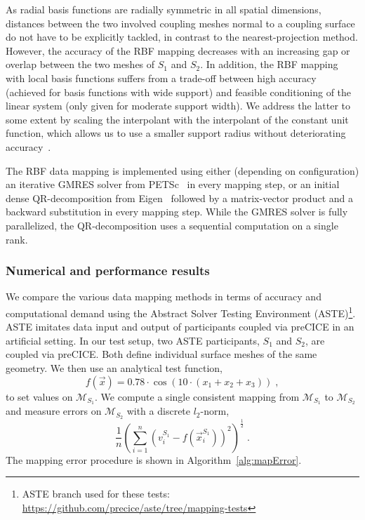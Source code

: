 As radial basis functions are radially symmetric in all spatial dimensions, distances between the two involved coupling meshes normal to a coupling surface do not have to be explicitly tackled, in contrast to the nearest-projection method. However, the accuracy of the RBF mapping decreases with an increasing gap or overlap between the two meshes of $S_1$ and $S_2$. In addition, the RBF mapping with local basis functions suffers from a trade-off between high accuracy (achieved for basis functions with wide support) and feasible conditioning of the linear system (only given for moderate support width). We address the latter to some extent by scaling the interpolant with the interpolant of the constant unit function, which allows us to use a smaller support radius without deteriorating accuracy~\cite{deparis2014rescaled, Lindner2017}.


The RBF data mapping is implemented using either (depending on configuration) an iterative GMRES solver from PETSc~\cite{petsc-user-ref} in every mapping step, or an initial dense QR-decomposition from Eigen~\cite{eigenweb} followed by a matrix-vector product and a backward substitution in every mapping step. While the GMRES solver is fully parallelized, the QR-decomposition uses a sequential computation on a single rank.


\subsubsection{Numerical and performance results}

We compare the various data mapping methods in terms of accuracy and computational demand using the Abstract Solver Testing Environment (ASTE)\footnote{ASTE branch used for these tests: \url{https://github.com/precice/aste/tree/mapping-tests}}. ASTE imitates data input and output of participants coupled via preCICE in an artificial setting. In our test setup, two ASTE participants, $S_1$ and $S_2$, are coupled via preCICE. Both define individual surface meshes of the same geometry. We then use an analytical test function,
\[
  f(\vec{x}) = 0.78 \cdot \cos \left(10 \cdot (x_1 + x_2 + x_3)\right)\;,
\]
to set values on $\mathcal{M}_{S_1}$. We compute a single consistent mapping from $\mathcal{M}_{S_1}$ to $\mathcal{M}_{S_2}$ and measure errors on $\mathcal{M}_{S_2}$ with a discrete $l_2$-norm,
\[
\frac{1}{n} \left(\sum_{i=1}^n \left(v_i^{S_1} - f(\vec{x}^{S_1}_i)\right)^2 \right)^{\frac{1}{2}}\;.    
\]
The mapping error procedure is shown in Algorithm~\ref{alg:mapError}.

